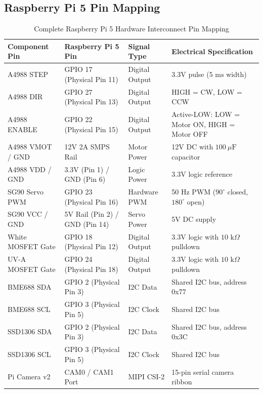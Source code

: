 \documentclass[11pt,a4paper]{article}
\begin{document}
\subsection{Raspberry Pi 5 Pin Mapping}
\begin{table}[H]
\centering
\small
\begin{tabularx}{\textwidth}{l l l l}
\toprule
\textbf{Component Pin} & \textbf{Raspberry Pi 5 Pin} & \textbf{Signal Type} & \textbf{Electrical Specification} \\
\midrule
A4988 STEP & GPIO 17 (Physical Pin 11) & Digital Output & 3.3V pulse ($5\text{ ms}$ width) \\
A4988 DIR & GPIO 27 (Physical Pin 13) & Digital Output & HIGH = CW, LOW = CCW \\
A4988 ENABLE & GPIO 22 (Physical Pin 15) & Digital Output & Active-LOW: LOW = Motor ON, HIGH = Motor OFF \\
A4988 VMOT / GND & 12V 2A SMPS Rail & Motor Power & 12V DC with $100\ \mu\text{F}$ capacitor \\
A4988 VDD / GND & 3.3V (Pin 1) / GND (Pin 6) & Logic Power & 3.3V logic reference \\
SG90 Servo PWM & GPIO 23 (Physical Pin 16) & Hardware PWM & 50 Hz PWM ($90^\circ$ closed, $180^\circ$ open) \\
SG90 VCC / GND & 5V Rail (Pin 2) / GND (Pin 14) & Servo Power & 5V DC supply \\
White MOSFET Gate & GPIO 18 (Physical Pin 12) & Digital Output & 3.3V logic with $10\text{ k}\Omega$ pulldown \\
UV-A MOSFET Gate & GPIO 24 (Physical Pin 18) & Digital Output & 3.3V logic with $10\text{ k}\Omega$ pulldown \\
BME688 SDA & GPIO 2 (Physical Pin 3) & I2C Data & Shared I2C bus, address 0x77 \\
BME688 SCL & GPIO 3 (Physical Pin 5) & I2C Clock & Shared I2C bus \\
SSD1306 SDA & GPIO 2 (Physical Pin 3) & I2C Data & Shared I2C bus, address 0x3C \\
SSD1306 SCL & GPIO 3 (Physical Pin 5) & I2C Clock & Shared I2C bus \\
Pi Camera v2 & CAM0 / CAM1 Port & MIPI CSI-2 & 15-pin serial camera ribbon \\
\bottomrule
\end{tabularx}
\caption{Complete Raspberry Pi 5 Hardware Interconnect Pin Mapping}
\end{table}

\end{document}

